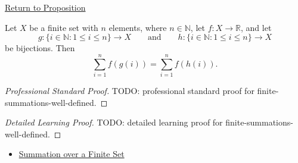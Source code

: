 \newpage
{}
\label{prf:finite-summations-well-defined}

\begin{remark*}[Return]
\hyperref[prop:finite-summations-well-defined]{Return to Proposition}
\end{remark*}

\begin{proposition*}
Let \(X\) be a finite set with \(n\) elements, where \(n \in \mathbb{N}\),
let \(f:X\to\mathbb{R}\), and let
\[
  g:\{i\in\mathbb{N}:1\le i\le n\}\to X
  \qquad\text{and}\qquad
  h:\{i\in\mathbb{N}:1\le i\le n\}\to X
\]
be bijections. Then
\[
  \sum_{i=1}^{n} f(g(i))
  =
  \sum_{i=1}^{n} f(h(i)).
\]
\end{proposition*}

\begin{proof}[Professional Standard Proof]
\LRAProofBodyStart
TODO: professional standard proof for finite-summations-well-defined.
\end{proof}

\begin{proof}[Detailed Learning Proof]
\LRAProofBodyStart
TODO: detailed learning proof for finite-summations-well-defined.
\end{proof}

\begin{remark*}
\end{remark*}

\begin{dependencies}
\begin{itemize}
  \item \hyperref[def:summation-over-finite-set]{Summation over a Finite Set}
\end{itemize}
\end{dependencies}

\clearpage
